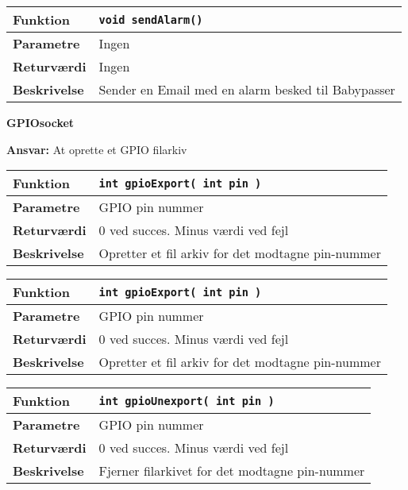 \begin{center}
    \begin{tabular}{ | l | p{} |}
    \hline
    \textbf{Funktion}	& \verb+void sendAlarm() +							\\ \hline
    \textbf{Parametre} 	& Ingen												\\ \hline
    \textbf{Returværdi}	& Ingen												\\ \hline
    \textbf{Beskrivelse}	& Sender en Email med en alarm besked til Babypasser	\\ \hline
    \end{tabular}
\end{center}

{\centering
\textbf{GPIOsocket}\par
}
\textbf{Ansvar:} At oprette et GPIO filarkiv \

\begin{center}
    \begin{tabular}{ | l | p{} |}
    \hline
    \textbf{Funktion}	& \verb+int gpioExport( int pin ) +					\\ \hline
    \textbf{Parametre} 	& GPIO pin nummer 									\\ \hline
    \textbf{Returværdi}	& 0 ved succes. Minus værdi ved fejl					\\ \hline
    \textbf{Beskrivelse}	& Opretter et fil arkiv for det modtagne pin-nummer	\\ \hline
    \end{tabular}
\end{center}

\begin{center}
    \begin{tabular}{ | l | p{} |}
    \hline
    \textbf{Funktion}	& \verb+int gpioExport( int pin ) +					\\ \hline
    \textbf{Parametre} 	& GPIO pin nummer									\\ \hline
    \textbf{Returværdi}	& 0 ved succes. Minus værdi ved fejl					\\ \hline
    \textbf{Beskrivelse}	& Opretter et fil arkiv for det modtagne pin-nummer	\\ \hline
    \end{tabular}
\end{center}

\begin{center}
    \begin{tabular}{ | l | p{} |}
    \hline
    \textbf{Funktion}	& \verb+int gpioUnexport( int pin ) +			\\ \hline
    \textbf{Parametre} 	& GPIO pin nummer								\\ \hline
    \textbf{Returværdi}	& 0 ved succes. Minus værdi ved fejl				\\ \hline
    \textbf{Beskrivelse}	& Fjerner filarkivet for det modtagne pin-nummer	\\ \hline
    \end{tabular}
\end{center}

